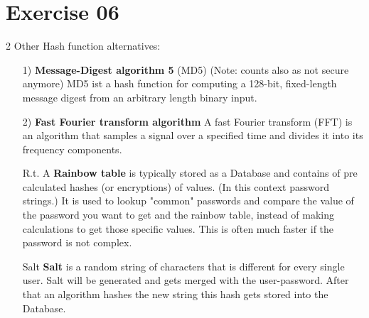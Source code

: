 \documentclass[11pt,a4paper]{scrartcl}
\begin{document}
\section*{Exercise 06}
2 Other Hash function alternatives:
\begin{itemize}
\item [1)] \textbf{Message-Digest algorithm 5} (MD5) (Note: counts also as not secure anymore)
		MD5 ist a hash function for computing a 128-bit, fixed-length message digest from an arbitrary length binary input.
\item [2)] \textbf{Fast Fourier transform algorithm}
		A fast Fourier transform (FFT) is an algorithm that samples a signal over a specified time and divides it into its frequency components.
\item [R.t.] A \textbf{Rainbow table} is typically stored as a Database and contains of pre calculated hashes (or encryptions) of values. (In this context password strings.) It is used to lookup "common" passwords and compare the value of the password you want to get and the rainbow table, instead of making calculations to get those specific values. This is often much faster if the password is not complex.
\item [Salt] \textbf{Salt} is a random string of characters that is different for every single user. Salt will be generated and gets merged with the user-password. After that an algorithm hashes the new string this hash gets stored into the Database.
\end{itemize}
\end{document}
